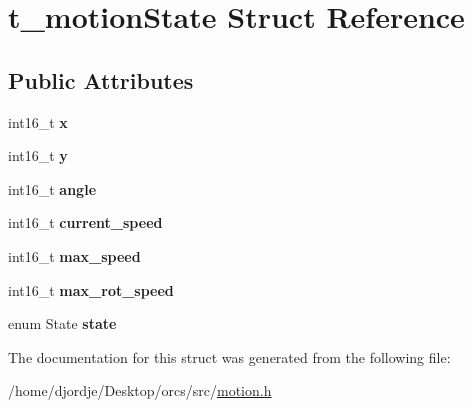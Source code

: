 \hypertarget{structt__motion_state}{}\section{t\+\_\+motion\+State Struct Reference}
\label{structt__motion_state}
\subsection*{Public Attributes}
\begin{DoxyCompactItemize}
\item 
int16\+\_\+t {\bfseries x}\hypertarget{structt__motion_state_ad688e5c2f5d204d258c9bfacaf6712a1}{}\label{structt__motion_state_ad688e5c2f5d204d258c9bfacaf6712a1}

\item 
int16\+\_\+t {\bfseries y}\hypertarget{structt__motion_state_a6723a99f9e8929080eae68a3042a2f78}{}\label{structt__motion_state_a6723a99f9e8929080eae68a3042a2f78}

\item 
int16\+\_\+t {\bfseries angle}\hypertarget{structt__motion_state_ac47820775fc3a583bd7f742ed0f8f4e2}{}\label{structt__motion_state_ac47820775fc3a583bd7f742ed0f8f4e2}

\item 
int16\+\_\+t {\bfseries current\+\_\+speed}\hypertarget{structt__motion_state_a8bab7e04b1010084692574f190e94dc6}{}\label{structt__motion_state_a8bab7e04b1010084692574f190e94dc6}

\item 
int16\+\_\+t {\bfseries max\+\_\+speed}\hypertarget{structt__motion_state_a44c5ab03c47a1e24cc40b2048178afbf}{}\label{structt__motion_state_a44c5ab03c47a1e24cc40b2048178afbf}

\item 
int16\+\_\+t {\bfseries max\+\_\+rot\+\_\+speed}\hypertarget{structt__motion_state_a7db50812d19f294561d7710907cb60c5}{}\label{structt__motion_state_a7db50812d19f294561d7710907cb60c5}

\item 
enum State {\bfseries state}\hypertarget{structt__motion_state_a88c4b8eeeeca86cad931e2511b1cd2ab}{}\label{structt__motion_state_a88c4b8eeeeca86cad931e2511b1cd2ab}

\end{DoxyCompactItemize}


The documentation for this struct was generated from the following file\+:\begin{DoxyCompactItemize}
\item 
/home/djordje/\+Desktop/orcs/src/\hyperlink{motion_8h}{motion.\+h}\end{DoxyCompactItemize}
